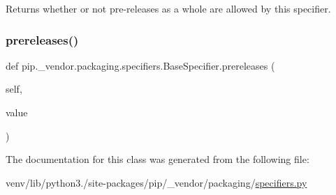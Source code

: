 \begin{DoxyVerb}Returns whether or not pre-releases as a whole are allowed by this
specifier.
\end{DoxyVerb}
 \mbox{\label{classpip_1_1__vendor_1_1packaging_1_1specifiers_1_1BaseSpecifier_aa7131aae1781958bf7e9093864a1651a}} 
\subsubsection{\texorpdfstring{prereleases()}{prereleases()}\hspace{0.1cm}{\footnotesize\ttfamily [2/2]}}
{\footnotesize\ttfamily def pip.\+\_\+vendor.\+packaging.\+specifiers.\+Base\+Specifier.\+prereleases (\begin{DoxyParamCaption}\item[{}]{self,  }\item[{}]{value }\end{DoxyParamCaption})}



The documentation for this class was generated from the following file\+:\begin{DoxyCompactItemize}
\item 
venv/lib/python3./site-\/packages/pip/\+\_\+vendor/packaging/\hyperlink{pip_2__vendor_2packaging_2specifiers_8py}{specifiers.\+py}\end{DoxyCompactItemize}
